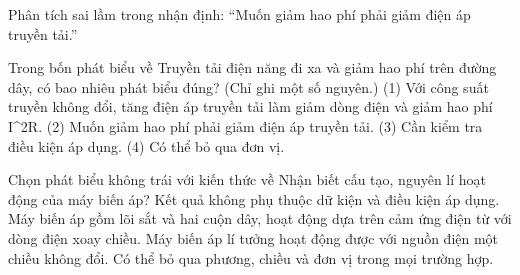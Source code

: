 \begin{bt}
Phân tích sai lầm trong nhận định: “Muốn giảm hao phí phải giảm điện áp truyền tải.”
\end{bt}

\begin{ex}
Trong bốn phát biểu về Truyền tải điện năng đi xa và giảm hao phí trên đường dây, có bao nhiêu phát biểu đúng? (Chỉ ghi một số nguyên.) (1) Với công suất truyền không đổi, tăng điện áp truyền tải làm giảm dòng điện và giảm hao phí I^2R. (2) Muốn giảm hao phí phải giảm điện áp truyền tải. (3) Cần kiểm tra điều kiện áp dụng. (4) Có thể bỏ qua đơn vị.
\end{ex}

\begin{ex}
Chọn phát biểu không trái với kiến thức về Nhận biết cấu tạo, nguyên lí hoạt động của máy biến áp?
\choice
{Kết quả không phụ thuộc dữ kiện và điều kiện áp dụng.}
{\True Máy biến áp gồm lõi sắt và hai cuộn dây, hoạt động dựa trên cảm ứng điện từ với dòng điện xoay chiều.}
{Máy biến áp lí tưởng hoạt động được với nguồn điện một chiều không đổi.}
{Có thể bỏ qua phương, chiều và đơn vị trong mọi trường hợp.}
\end{ex}

